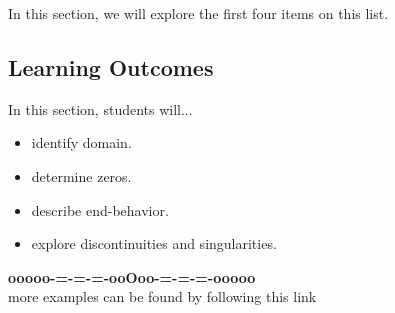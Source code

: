 \documentclass{ximera}
\begin{document}
In this section, we will explore the first four items on this list.









\subsection*{Learning Outcomes}

\begin{sectionOutcomes}
In this section, students will...

\begin{itemize}
\item identify domain.
\item determine zeros.
\item describe end-behavior.
\item explore discontinuities and singularities.
\end{itemize}
\end{sectionOutcomes}





















\begin{center}
\textbf{\textcolor{green!50!black}{ooooo-=-=-=-ooOoo-=-=-=-ooooo}} \\

more examples can be found by following this link\\ 

\end{center}
\end{document}
